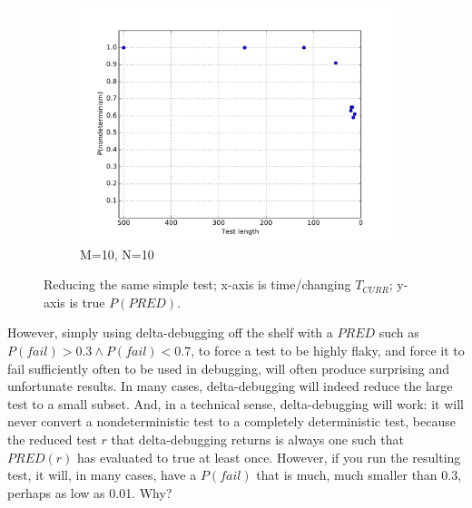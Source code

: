 \begin{figure}
\begin{subfigure}{0.30\columnwidth}
\end{subfigure}
\begin{subfigure}{0.30\columnwidth}
\centering
\includegraphics[width=\columnwidth]{lengthddminforceprep}
\caption{M=10, N=10}
\label{fig:p3}
\end{subfigure}
\caption{Reducing the same simple test; x-axis is time/changing
  $T_\mathit{CURR}$; y-axis is true $P(\mathit{PRED})$.}
\end{figure}

However, simply using delta-debugging off the shelf with a $\mathit{PRED}$
such as $P(\mathit{fail}) > 0.3 \wedge P(\mathit{fail}) < 0.7$, to force a test to be highly flaky, and force it to fail
sufficiently often to be used in debugging, will often produce
surprising and unfortunate results.  In many cases,
delta-debugging will indeed reduce the large test to a small subset.
And, in a technical sense, delta-debugging will work:  it will never
convert a nondeterministic test to a completely deterministic test,
because the reduced test $r$ that delta-debugging returns is always one
such that $\mathit{PRED}(r)$ has evaluated to true at least once.
However, if you run the resulting test, it will, in many cases, have a
$P(\mathit{fail})$ that is much, much smaller than
0.3, perhaps as low as 0.01.  Why?

